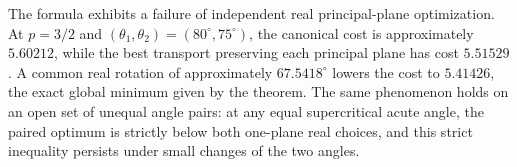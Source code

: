 The formula exhibits a failure of independent real principal-plane
optimization. At $p=3/2$ and $(\theta_1,\theta_2)=(80^\circ,75^\circ)$,
the canonical cost is approximately $5.60212$, while the best transport
preserving each principal plane has cost $5.51529$. A common real
rotation of approximately $67.5418^\circ$ lowers the cost to $5.41426$,
the exact global minimum given by the theorem. The same phenomenon holds
on an open set of unequal angle pairs: at any equal supercritical acute
angle, the paired optimum is strictly below both one-plane real choices,
and this strict inequality persists under small changes of the two angles.
